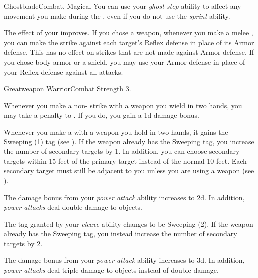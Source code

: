 \begin{feat}{Ghostblade}{Combat, Magical}
         You can use your \textit{ghost step} ability to affect any movement you make during the , even if you do not use the \textit{sprint} ability.

         The effect of your  improves.
        If you chose a weapon, whenever you make a melee , you can make the strike against each target's Reflex defense in place of its Armor defense.
        This has no effect on strikes that are not made against Armor defense.
        If you chose body armor or a shield, you may use your Armor defense in place of your Reflex defense against all attacks.
    \end{feat}

    \begin{feat}{Greatweapon Warrior}{Combat}
        \featpre Strength 3.

         Whenever you make a non- strike with a weapon you wield in two hands, you may take a  penalty to .
        If you do, you gain a \plus1d damage bonus.

         Whenever you make a   with a weapon you hold in two hands, it gains the Sweeping (1) tag (see ).
        If the weapon already has the Sweeping tag, you increase the number of secondary targets by 1.
        In addition, you can choose secondary targets within 15 feet of the primary target instead of the normal 10 feet.
        Each secondary target must still be adjacent to you unless you are using a  weapon (see ).

         The damage bonus from your \textit{power attack} ability increases to \plus2d.
        In addition, \textit{power attacks} deal double damage to objects.

         The tag granted by your \textit{cleave} ability changes to be Sweeping (2).
        If the weapon already has the Sweeping tag, you instead increase the number of secondary targets by 2.

         The damage bonus from your \textit{power attack} ability increases to \plus3d.
        In addition, \textit{power attacks} deal triple damage to objects instead of double damage.
    \end{feat}


